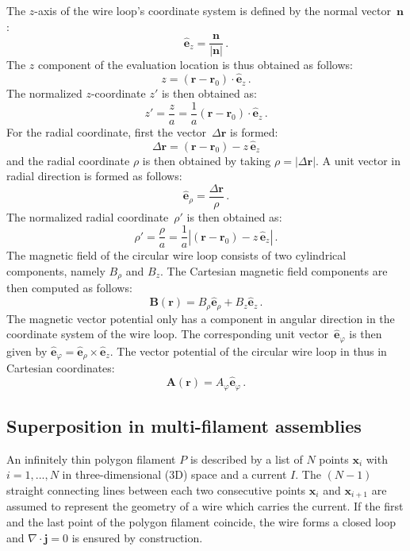 The $z$-axis of the wire loop's coordinate system is defined by the normal vector~$\mathbf{n}$:
\begin{equation}
  \hat{\mathbf{e}}_z = \frac{\mathbf{n}}{|\mathbf{n}|} \, .
\end{equation}
The $z$ component of the evaluation location is thus obtained as follows:
\begin{equation}
  z = (\mathbf{r} - \mathbf{r}_0) \cdot \hat{\mathbf{e}}_z \, .
\end{equation}
The normalized $z$-coordinate $z'$ is then obtained as:
\begin{equation}
  z' = \frac{z}{a} = \frac{1}{a} (\mathbf{r} - \mathbf{r}_0) \cdot \hat{\mathbf{e}}_z \, .
\end{equation}
For the radial coordinate, first the vector~$\Delta \mathbf{r}$ is formed:
\begin{equation}
  \Delta \mathbf{r} = (\mathbf{r} - \mathbf{r}_0) - z \, \hat{\mathbf{e}}_z
\end{equation}
and the radial coordinate $\rho$ is then obtained by taking $\rho = |\Delta \mathbf{r}|$.
A unit vector in radial direction is formed as follows:
\begin{equation}
  \hat{\mathbf{e}}_\rho = \frac{\Delta \mathbf{r}}{\rho} \, .
\end{equation}
The normalized radial coordinate~$\rho'$ is then obtained as:
\begin{equation}
  \rho' = \frac{\rho}{a} = \frac{1}{a} |(\mathbf{r} - \mathbf{r}_0) - z \, \hat{\mathbf{e}}_z| \, .
\end{equation}
The magnetic field of the circular wire loop consists of two cylindrical components, namely $B_\rho$ and $B_z$.
The Cartesian magnetic field components are then computed as follows:
\begin{equation}
  \mathbf{B}(\mathbf{r}) = B_\rho \hat{\mathbf{e}}_\rho + B_z \hat{\mathbf{e}}_z \, .
\end{equation}
The magnetic vector potential only has a component in angular direction in the coordinate system of the wire loop.
The corresponding unit vector~$\hat{\mathbf{e}}_\varphi$ is then given by
$\hat{\mathbf{e}}_\varphi = \hat{\mathbf{e}}_\rho \times \hat{\mathbf{e}}_z$.
The vector potential of the circular wire loop in thus in Cartesian coordinates:
\begin{equation}
  \mathbf{A}(\mathbf{r}) = A_\varphi \hat{\mathbf{e}}_\varphi \, .
\end{equation}

\subsection{Superposition in multi-filament assemblies}
An infinitely thin polygon filament $P$ is described by a list of $N$ points $\mathbf{x}_i$ with $i=1, ..., N$ in three-dimensional (3D) space and a current $I$.
The $(N-1)$ straight connecting lines between each two consecutive points $\mathbf{x}_i$ and $\mathbf{x}_{i+1}$ are assumed to represent the geometry of a wire which carries the current.
If the first and the last point of the polygon filament coincide, the wire forms a closed loop and $\nabla \cdot \mathbf{j} = 0$ is ensured by construction.

